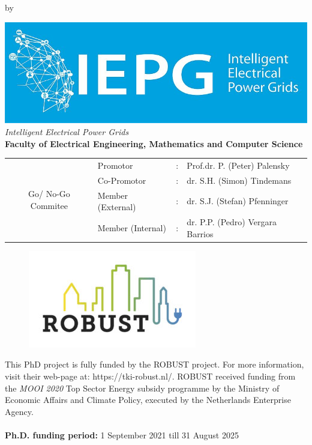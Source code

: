 \begin{titlepage}

\begin{center}

{\makeatletter
\largetitlestyle\fontsize{45}{45}\color{black}\selectfont\@title
\makeatother}


{\makeatletter
\ifdefvoid{\@subtitle}{}{\bigskip\fontsize{20}{20}\selectfont\@subtitle}
\makeatother}

\bigskip
\bigskip

by

\bigskip
\bigskip

{\makeatletter
\largetitlestyle\fontsize{25}{25}\selectfont\@author
\makeatother}

\bigskip
\bigskip

\setlength\extrarowheight{2pt}

\bigskip
\bigskip
    \includegraphics[width=0.25\linewidth]{figures/IEPG logo.jpg}\\
    \textit{Intelligent Electrical Power Grids}\\
    \textbf{Faculty of Electrical Engineering, Mathematics and Computer Science}

\vfill
\begin{tabular}{c|lcl}
\multirow{4}{*}{Go/ No-Go Commitee} & Promotor          & : & Prof.dr. P. (Peter) Palensky     \\
                                    & Co-Promotor       & : & dr. S.H. (Simon) Tindemans       \\
                                    & Member (External) & : & dr. S.J. (Stefan) Pfenninger                                 \\
                                    & Member (Internal) & : & dr. P.P. (Pedro) Vergara Barrios
\end{tabular}
\end{center}
\bigskip
\bigskip
\bigskip
\bigskip
\begin{figure}[h]
    \includegraphics[width=0.25\linewidth]{figures/ROBU_logo_groot (1).jpeg}
    \label{fig:my_label}
\end{figure}
\footnotesize{This PhD project is fully funded by the ROBUST project. For more information, visit their web-page at: https://tki-robust.nl/. ROBUST received funding from the \textit{MOOI 2020} Top Sector Energy subsidy programme by the Ministry of Economic Affairs and Climate Policy, executed by the Netherlands Enterprise Agency.\\
\\
\textbf{Ph.D. funding period:} 1 September 2021 till 31 August 2025}
\bigskip
\bigskip


\end{titlepage}
